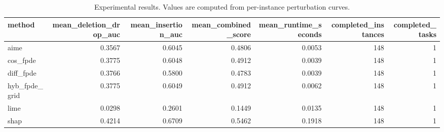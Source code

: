 \begin{table}[t]
\caption{Experimental results. Values are computed from per-instance perturbation curves.}
\label{tab:main_results_computed}
\centering
\begin{tabular}{lrrrrrr}
\toprule
method & mean\_deletion\_drop\_auc & mean\_insertion\_auc & mean\_combined\_score & mean\_runtime\_seconds & completed\_instances & completed\_tasks \\
\midrule
aime & 0.3567 & 0.6045 & 0.4806 & 0.0053 & 148 & 1 \\
cos\_fpde & 0.3775 & 0.6048 & 0.4912 & 0.0039 & 148 & 1 \\
diff\_fpde & 0.3766 & 0.5800 & 0.4783 & 0.0039 & 148 & 1 \\
hyb\_fpde\_grid & 0.3775 & 0.6049 & 0.4912 & 0.0062 & 148 & 1 \\
lime & 0.0298 & 0.2601 & 0.1449 & 0.0135 & 148 & 1 \\
shap & 0.4214 & 0.6709 & 0.5462 & 0.1918 & 148 & 1 \\
\bottomrule
\end{tabular}

\end{table}
